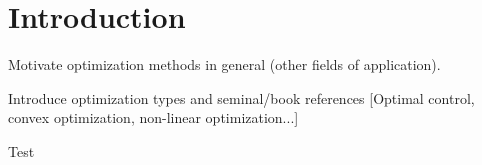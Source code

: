 
\section{Introduction}\label{sec:1}

Motivate optimization methods in general (other fields of application).

Introduce optimization types and seminal/book references [Optimal control, convex optimization, non-linear optimization...]

Test